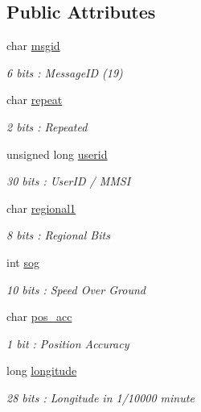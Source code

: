 \subsection*{Public Attributes}
\begin{DoxyCompactItemize}
\item 
char \mbox{\hyperlink{structaismsg__19_a7af7e87bf7e73ee7a2de7ea325014085}{msgid}}
\begin{DoxyCompactList}\small\item\em 6 bits \+: Message\+ID (19) \end{DoxyCompactList}\item 
char \mbox{\hyperlink{structaismsg__19_a185d29070f41e1b4cab19aa7b5682df1}{repeat}}
\begin{DoxyCompactList}\small\item\em 2 bits \+: Repeated \end{DoxyCompactList}\item 
unsigned long \mbox{\hyperlink{structaismsg__19_adf5369af8d06a58277974b7dabbda529}{userid}}
\begin{DoxyCompactList}\small\item\em 30 bits \+: User\+ID / M\+M\+SI \end{DoxyCompactList}\item 
char \mbox{\hyperlink{structaismsg__19_a2f9a49f0575fa9444045c69fb55a51fd}{regional1}}
\begin{DoxyCompactList}\small\item\em 8 bits \+: Regional Bits \end{DoxyCompactList}\item 
int \mbox{\hyperlink{structaismsg__19_a9796c7b6c41001610694ac944588c305}{sog}}
\begin{DoxyCompactList}\small\item\em 10 bits \+: Speed Over Ground \end{DoxyCompactList}\item 
char \mbox{\hyperlink{structaismsg__19_aceaefec99f3b6ecd2938b87993d40203}{pos\+\_\+acc}}
\begin{DoxyCompactList}\small\item\em 1 bit \+: Position Accuracy \end{DoxyCompactList}\item 
long \mbox{\hyperlink{structaismsg__19_aa635c5e55300ddc875e9618d0d935ec0}{longitude}}
\begin{DoxyCompactList}\small\item\em 28 bits \+: Longitude in 1/10000 minute \end{DoxyCompactList}\item 

\end{DoxyCompactItemize}
